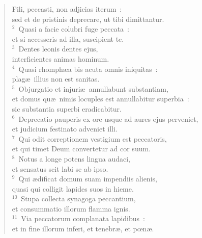 \begin{flushleft}\begin{verse}\vspace{-19pt}\hspace{6pt}Fili, peccasti, non adjicias iterum~:\\\hspace{6pt} sed et de pristinis deprecare, ut tibi dimittantur.\\
${}^{2}$~Quasi a facie colubri fuge peccata~:\\ et si accesseris ad illa, suscipient te.\\
${}^{3}$~Dentes leonis dentes ejus,\\ interficientes animas hominum.\\
${}^{4}$~Quasi rhomph\ae a bis acuta omnis iniquitas~:\\ plag\ae\ illius non est sanitas.\\
${}^{5}$~Objurgatio et injuri\ae\ annullabunt substantiam,\\ et domus qu\ae\ nimis locuples est annullabitur superbia~:\\ sic substantia superbi eradicabitur.\\
${}^{6}$~Deprecatio pauperis ex ore usque ad aures ejus perveniet,\\ et judicium festinato adveniet illi.\\
${}^{7}$~Qui odit correptionem vestigium est peccatoris,\\ et qui timet Deum convertetur ad cor suum.\\
${}^{8}$~Notus a longe potens lingua audaci,\\ et sensatus scit labi se ab ipso.\\
${}^{9}$~Qui \ae dificat domum suam impendiis alienis,\\ quasi qui colligit lapides suos in hieme.\\
${}^{10}$~Stupa collecta synagoga peccantium,\\ et consummatio illorum flamma ignis.\\
${}^{11}$~Via peccatorum complanata lapidibus~:\\ et in fine illorum inferi, et tenebr\ae , et pœn\ae .\end{verse}\end{flushleft}



